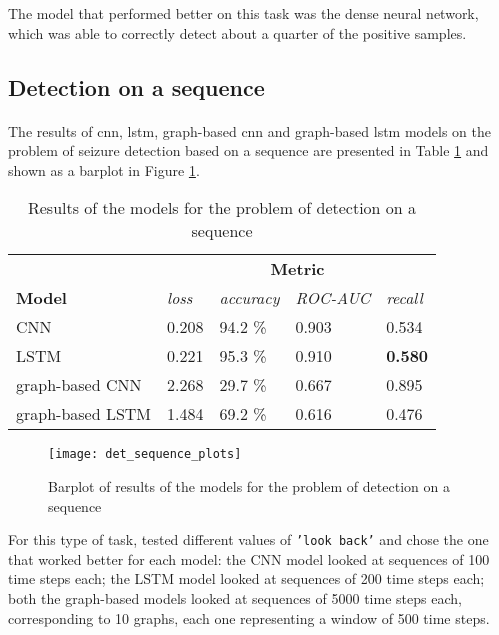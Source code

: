 The model that performed better on this task was the dense neural network, which was able to correctly detect about a quarter of the positive samples.


\subsection{Detection on a sequence}
\paragraph{} The results of \acs{cnn}, \acs{lstm}, graph-based \acs{cnn} and graph-based \acs{lstm} models on the problem of seizure detection based on a sequence are presented in Table \ref{tab:det_sequence_results} and shown as a barplot in Figure \ref{fig:det_sequence_plots}.
\begin{table}[t]
    \centering
    \begin{tabular}{lllll}
        \hline
                          & \multicolumn{4}{c}{\textbf{Metric}}                                    \\ \cline{2-5} 
        \textbf{Model}    & \textit{loss} & \textit{accuracy} & \textit{ROC-AUC} & \textit{recall} \\ \hline
        CNN               & 0.208         & 94.2 \%           & 0.903            & 0.534           \\
        LSTM              & 0.221         & 95.3 \%           & 0.910            & \textbf{0.580}  \\
        graph-based CNN   & 2.268         & 29.7 \%           & 0.667            & 0.895           \\
        graph-based LSTM  & 1.484         & 69.2 \%           & 0.616            & 0.476           \\\hline
    \end{tabular}
    \caption{Results of the models for the problem of detection on a sequence}
    \label{tab:det_sequence_results}
\end{table}

\begin{figure}[t]
    \centering
    \texttt{[image: det\_sequence\_plots]}
    \caption{Barplot of results of the models for the problem of detection on a sequence}
    \label{fig:det_sequence_plots}
\end{figure}

For this type of task, tested different values of \texttt{'look back'} and chose the one that worked better for each model: the CNN model looked at sequences of 100 time steps each; the LSTM model looked at sequences of 200 time steps each; both the graph-based models looked at sequences of 5000 time steps each, corresponding to 10 graphs, each one representing a window of 500 time steps.

